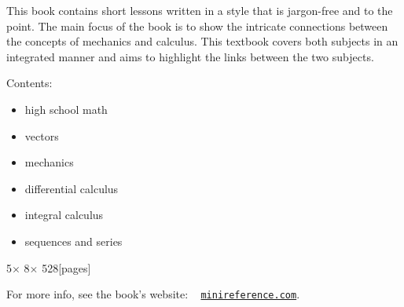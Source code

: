 \documentclass[10pt]{IEEEtran}
\begin{document}
	This book contains short lessons
	written in a style that is jargon-free and to the point.
	The main focus of the book is to show the intricate connections
	between the concepts of mechanics and calculus.
	This textbook covers both subjects in an integrated manner and aims to highlight the
	links between the two subjects.

	Contents:
	\begin{itemize}
		\item	{\sc high school math}
		\item	{\sc vectors}
		\item	{\sc mechanics}
		\item	{\sc differential calculus}
		\item	{\sc integral calculus}
		\item	{\sc sequences and series}
	\end{itemize}

	\vspace{1mm}

	\noindent
	\hfill {\small   5\textonehalf[in] $\times$ 8\textonehalf[in] $\times$ 528[pages]} 
	
	\noindent
	For more info, see the book's website: \  %
	\href{http://minireference.com/}{\texttt{minireference.com}}.
\end{document}
